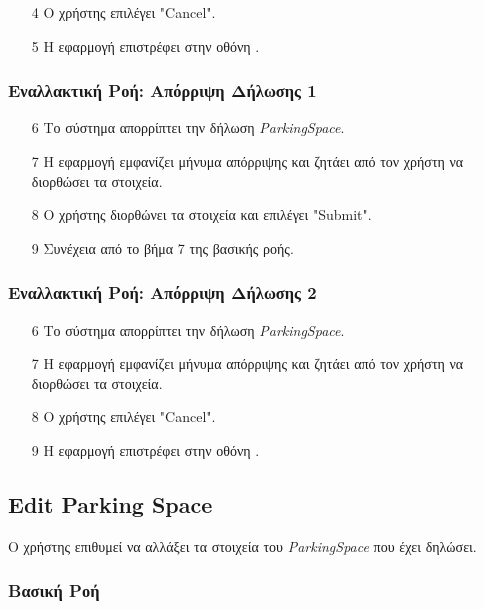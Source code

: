 \begin{enumerate}
    \item[4] Ο χρήστης επιλέγει "Cancel".
    \item[5] Η εφαρμογή επιστρέφει στην οθόνη .
\end{enumerate}

\subsubsection{Εναλλακτική Ροή: Απόρριψη Δήλωσης 1}

\begin{enumerate}
    \item[6] Το σύστημα απορρίπτει την δήλωση \textit{ParkingSpace}.
    \item[7] Η εφαρμογή εμφανίζει μήνυμα απόρριψης και ζητάει από τον χρήστη να
        διορθώσει τα στοιχεία.
    \item[8] Ο χρήστης διορθώνει τα στοιχεία και επιλέγει "Submit".
    \item[9] Συνέχεια από το βήμα 7 της βασικής ροής.
\end{enumerate}

\subsubsection{Εναλλακτική Ροή: Απόρριψη Δήλωσης 2}

\begin{enumerate}
    \item[6] Το σύστημα απορρίπτει την δήλωση \textit{ParkingSpace}.
    \item[7] Η εφαρμογή εμφανίζει μήνυμα απόρριψης και ζητάει από τον χρήστη να
        διορθώσει τα στοιχεία.
    \item[8] Ο χρήστης επιλέγει "Cancel".
    \item[9] Η εφαρμογή επιστρέφει στην οθόνη .
\end{enumerate}

\newpage

\subsection{Edit Parking Space}
\label{uc:edit-parking-space}

Ο χρήστης επιθυμεί να αλλάξει τα στοιχεία του \textit{ParkingSpace} που έχει
δηλώσει.

\subsubsection{Βασική Ροή}

